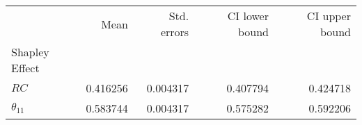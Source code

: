 \begin{tabular}{lrrrr}
\toprule
{} &      Mean &  Std. errors &  CI lower bound &  CI upper bound \\
Shapley Effect &           &              &                 &                 \\
\midrule
$RC$           &  0.416256 &     0.004317 &        0.407794 &        0.424718 \\
$\theta_{11}$  &  0.583744 &     0.004317 &        0.575282 &        0.592206 \\
\bottomrule
\end{tabular}
